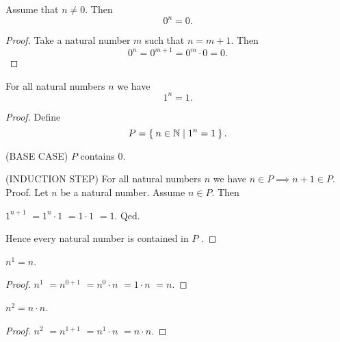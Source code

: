 \documentclass[../../arithmetic.tex]{subfiles}
\begin{document}
  \begin{forthel}
    \begin{proposition}\label{Arithmetic_01_04_876526}
      Assume that $n \neq 0$.
      Then \[ 0^{n} = 0. \]
    \end{proposition}
    \begin{proof}
      Take a natural number $m$ such that $n = m + 1$.
      Then
      \[
          0^{n}
        = 0^{m + 1}       %
        = 0^{m} \cdot 0   %
        = 0.              %
      \]
    \end{proof}


    \begin{proposition}\label{Arithmetic_01_04_577060}
      For all natural numbers $n$ we have \[ 1^{n} = 1. \]
    \end{proposition}
    \begin{proof}
      Define \[ P = \Set{n \in \mathbb{N} | 1^{n} = 1}. \]

      (BASE CASE) $P$ contains $0$.

      (INDUCTION STEP) For all natural numbers $n$ we have $n \in P \implies n + 1 \in P$. \\
      Proof.
        Let $n$ be a natural number.
        Assume $n \in P$.
        Then

        $  1^{n + 1}$
        $= 1^{n} \cdot 1$   %
        $= 1 \cdot 1$       %
        $= 1$.              %
      Qed.

      Hence every natural number is contained in $P$ .
    \end{proof}


    \begin{proposition}\label{Arithmetic_01_04_848167}
      $n^{1} = n$.
    \end{proposition}
    \begin{proof}
      $  n^{1}$
      $= n^{0 + 1}$       %
      $= n^{0} \cdot n$   %
      $= 1 \cdot n$       %
      $= n$.              %
    \end{proof}


    \begin{proposition}\label{Arithmetic_01_04_846549}
      $n^{2} = n \cdot n$.
    \end{proposition}
    \begin{proof}
      $  n^{2}$
      $= n^{1 + 1}$       %
      $= n^{1} \cdot n$   %
      $= n \cdot n$.      %
    \end{proof}
  \end{forthel}
\end{document}
